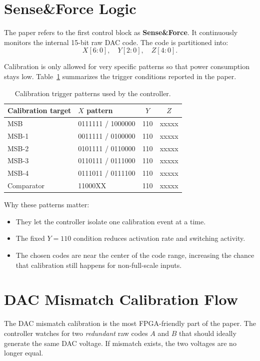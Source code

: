 \documentclass[11pt]{article}
\begin{document}
\section*{Sense\&Force Logic}
The paper refers to the first control block as \textbf{Sense\&Force}. It continuously monitors the internal 15-bit raw DAC code. The code is partitioned into:
\[
X[6:0], \quad Y[2:0], \quad Z[4:0].
\]

\noindent Calibration is only allowed for very specific patterns so that power consumption stays low. Table~\ref{tab:triggers} summarizes the trigger conditions reported in the paper.

\begin{table}[h!]
\centering
\caption{Calibration trigger patterns used by the controller.}
\label{tab:triggers}
\begin{tabular}{|l|l|c|c|}
\hline
Calibration target & \(X\) pattern & \(Y\) & \(Z\) \\
\hline
MSB & 0111111 / 1000000 & 110 & xxxxx \\
MSB-1 & 0011111 / 0100000 & 110 & xxxxx \\
MSB-2 & 0101111 / 0110000 & 110 & xxxxx \\
MSB-3 & 0110111 / 0111000 & 110 & xxxxx \\
MSB-4 & 0111011 / 0111100 & 110 & xxxxx \\
Comparator & 11000XX & 110 & xxxxx \\
\hline
\end{tabular}
\end{table}

\noindent Why these patterns matter:
\begin{itemize}
    \item They let the controller isolate one calibration event at a time.
    \item The fixed \(Y=110\) condition reduces activation rate and switching activity.
    \item The chosen codes are near the center of the code range, increasing the chance that calibration still happens for non-full-scale inputs.
\end{itemize}

\section*{DAC Mismatch Calibration Flow}
The DAC mismatch calibration is the most FPGA-friendly part of the paper. The controller watches for two \emph{redundant} raw codes \(A\) and \(B\) that should ideally generate the same DAC voltage. If mismatch exists, the two voltages are no longer equal.
\end{document}
